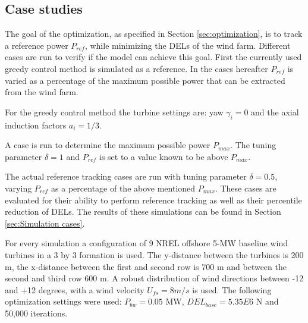 \subsection{Case studies}
\label{sec:Case studies}
The goal of the optimization, as specified in Section \ref{sec:optimization}, is to track a reference power $P_{ref}$, while minimizing the DELs of the wind farm. Different cases are run to verify if the model can achieve this goal. First the currently used greedy control method is simulated as a reference. In the cases hereafter $P_{ref}$ is varied as a percentage of the maximum possible power that can be extracted from the wind farm.

For the greedy control method the turbine settings are: yaw $\gamma_i = 0$ and the axial induction factors $a_i = 1/3$. 

A case is run to determine the maximum possible power $P_{max}$. The tuning parameter $\delta = 1$ and $P_{ref}$ is set to a value known to be above $P_{max}$. 

The actual reference tracking cases are run with tuning parameter $\delta = 0.5$, varying $P_{ref}$ as a percentage of the above mentioned $P_{max}$. These cases are evaluated for their ability to perform reference tracking as well as their percentile reduction of DELs. The results of these simulations can be found in Section \ref{sec:Simulation cases}.

For every simulation a configuration of 9 NREL offshore 5-MW baseline wind turbines in a 3 by 3 formation is used. The y-distance between the turbines is 200 m, the x-distance between the first and second row is 700 m and between the second and third row 600 m. A robust distribution of wind directions between -12 and +12 degrees, with a wind velocity $U_{fs} = 8 m/s$ is used. The following optimization settings were used: $P_{bw} = 0.05$ MW, $DEL_{base} = 5.35E6$ N and 50,000 iterations. 